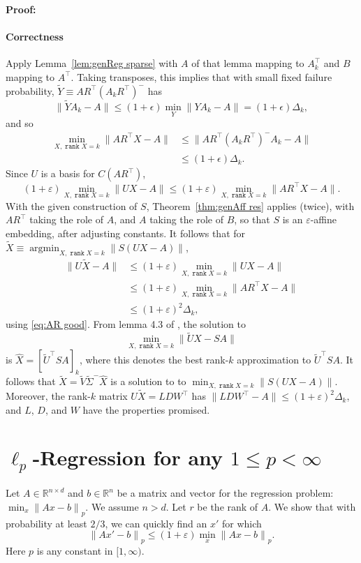 \documentclass{sig-alternate}
\newcommand{\norm}[1]{{\| #1 \|}}
\DeclareMathOperator{\rank}{\mathtt{rank}}
\DeclareMathOperator{\argmin}{\mathrm{argmin}}
\newcommand{\eps}{\varepsilon}
\def\FullBox{\hbox{\vrule width 8pt height 8pt depth 0pt}}
\def\qed{\ifmmode\qquad\FullBox\else{\unskip\nobreak\hfil
\penalty50\hskip1em\null\nobreak\hfil\FullBox
\parfillskip=0pt\finalhyphendemerits=0\endgraf}\fi}
\newenvironment{proof}{\begin{trivlist} \item {\bf Proof:~~}}
  {\qed\end{trivlist}}
\begin{document}
\begin{proof}
\paragraph{Correctness}
Apply Lemma~\ref{lem:genReg sparse} with $A$ of that lemma
mapping to $A_k^\top$ and $B$ mapping to $A^\top$.
Taking transposes, this implies that with small fixed failure probability,
$\tilde Y \equiv AR^\top (A_kR^\top)^-$
has
\[
\norm{\tilde Y A_k - A} \le (1+\epsilon) \min_Y\norm{ YA_k - A} = (1+\epsilon)\Delta_k,
\]
and so
\begin{align}\label{eq:AR good}
\min_{X, \rank X=k} \norm{AR^\top X - A}
	  & \le \norm{AR^\top (A_kR^\top)^-A_k - A} \nonumber
	  \\ & \le (1+\epsilon)\Delta_k.
\end{align}
Since $U$ is a basis for $C(AR^\top)$,
\[
(1+\eps)\min_{X, \rank X=k} \norm{UX - A}
	\le (1+\eps) \min_{X, \rank X=k} \norm{AR^\top X - A}.
\]
With the given construction of $S$,
Theorem~\ref{thm:genAff res} applies (twice), with $AR^\top$ taking the role
of $A$, and $A$ taking the role of $B$, so that $S$ is
an $\eps$-affine embedding, after adjusting constants.
It follows that
for $\tilde X\equiv\argmin_{X, \rank X=k} \norm{S(UX - A)}$,
\begin{align*}
\norm{U\tilde X - A}
	  & \le (1+\eps)\min_{X, \rank X=k} \norm{UX - A}
	\\ & \le (1+\eps) \min_{X, \rank X=k} \norm{AR^\top X - A}
	\\ & \le (1+\eps)^2\Delta_k,
\end{align*}
using \eqref{eq:AR good}.
From lemma 4.3 of \cite{cw09},
the solution to
\[
\min_{X,\rank X=k}\norm{\tilde U X - SA}
\]
is $\hat X = [\tilde U^\top SA]_k$, where this denotes the best rank-$k$
approximation to $\tilde U^\top SA$.
It follows that $\tilde X = \tilde V\tilde \Sigma^- \hat X$ is a solution to
to $\min_{X, \rank X=k} \norm{S(UX - A)}$.
Moreover, the rank-$k$ matrix $U\tilde X = LDW^\top$
has $\norm{LDW^\top- A}\le (1+\eps)^2\Delta_k$,
and $L$, $D$, and $W$ have the properties promised.
\end{proof}













\section{$\ell_p$-Regression for any $1 \leq p < \infty$} \label{sec: ell_p}
Let $A \in \mathbb{R}^{n \times d}$ and $b \in \mathbb{R}^n$ be a matrix and
vector for the regression problem: $\min_x \norm{Ax-b}_p$. We assume $n > d$. 
Let $r$ be the rank of $A$. 
We show that with probability at least $2/3$, 
we can quickly find an $x'$ for which
$$\norm{Ax'-b}_p \leq (1+\eps)\min_x \norm{Ax-b}_p.$$
Here $p$ is any constant in $[1, \infty)$. 
\end{document}
